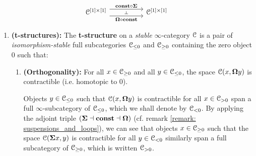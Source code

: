 \begin{remark}
                        $$
                            \begin{tikzcd}
                            	{\C^{[1] \x [1]}} && {\C^{[1] \x [1]}}
                            	\arrow[""{name=0, anchor=center, inner sep=0}, "{\loopspace \circ \const}"', shift right=2, from=1-1, to=1-3]
                            	\arrow[""{name=1, anchor=center, inner sep=0}, "{\const \circ \suspension}", shift left=2, from=1-1, to=1-3]
                            	\arrow["\dashv"{anchor=center, rotate=-90}, draw=none, from=1, to=0]
                            \end{tikzcd}
                        $$
                \end{remark}
            
                \begin{definition}[t-structures] \label{def: t_structures}   
                    \noindent {}
                    \begin{enumerate}
                        \item \textbf{(t-structures):} The \textbf{t-structure} on a \textit{stable} $\infty$-category $\mathcal{C}$ is a pair of \textit{isomorphism-stable} full subcategories $\mathcal{C}_{\leq 0}$ and $\mathcal{C}_{\geq 0}$ containing the zero object $0$ such that:
                            \begin{enumerate}
                                \item \textbf{(Orthogonality):} For all $x \in \mathcal{C}_{\geq 0}$ and all $y \in \mathcal{C}_{\leq 0}$, the space $\mathcal{C}(x, \mathbf{\Omega} y)$ is contractible (i.e. homotopic to $0$). 
                                
                                Objects $y \in \mathcal{C}_{\leq 0}$ such that $\mathcal{C}(x, \mathbf{\Omega} y)$ is contractible for all $x \in \mathcal{C}_{> 0}$ span a full $\infty$-subcategory of $\mathcal{C}_{\leq 0}$, which we shall denote by $\mathcal{C}_{< 0}$. By applying the adjoint triple $(\mathbf{\Sigma} \dashv \mathbf{const} \dashv \mathbf{\Omega})$ (cf. remark \ref{remark: suspensions_and_loops}), we can see that objects $x \in \mathcal{C}_{\geq 0}$ such that the space $\mathcal{C}(\mathbf{\Sigma} x, y)$ is contractible for all $y \in \mathcal{C}_{< 0}$ similarly span a full subcategory of $\mathcal{C}_{\geq 0}$, which is written $\mathcal{C}_{> 0}$. 
                                

\end{enumerate}
\end{enumerate}
\end{definition}
